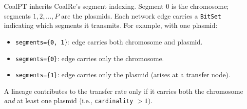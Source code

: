\documentclass[11pt]{article}
\begin{document}
CoalPT inherits CoalRe's segment indexing. Segment 0 is the chromosome; segments $1, 2, \ldots, P$ are the plasmids. Each network edge carries a \texttt{BitSet} indicating which segments it transmits. For example, with one plasmid:
\begin{itemize}
  \item \texttt{segments=\{0, 1\}}: edge carries both chromosome and plasmid.
  \item \texttt{segments=\{0\}}: edge carries only the chromosome.
  \item \texttt{segments=\{1\}}: edge carries only the plasmid (arises at a transfer node).
\end{itemize}

\noindent A lineage contributes to the transfer rate only if it carries both the chromosome \emph{and} at least one plasmid (i.e., \texttt{cardinality} $> 1$).
\end{document}
